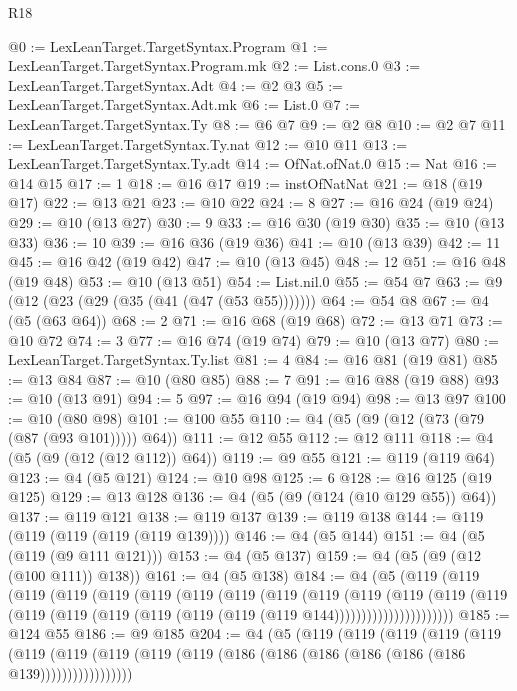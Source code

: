 \begin{lexlean}{R18}
\begin{coremodule}
@0 := LexLeanTarget.TargetSyntax.Program
@1 := LexLeanTarget.TargetSyntax.Program.mk
@2 := List.cons.{0}
@3 := LexLeanTarget.TargetSyntax.Adt
@4 := @2 @3
@5 := LexLeanTarget.TargetSyntax.Adt.mk
@6 := List.{0}
@7 := LexLeanTarget.TargetSyntax.Ty
@8 := @6 @7
@9 := @2 @8
@10 := @2 @7
@11 := LexLeanTarget.TargetSyntax.Ty.nat
@12 := @10 @11
@13 := LexLeanTarget.TargetSyntax.Ty.adt
@14 := OfNat.ofNat.{0}
@15 := Nat
@16 := @14 @15
@17 := 1
@18 := @16 @17
@19 := instOfNatNat
@21 := @18 (@19 @17)
@22 := @13 @21
@23 := @10 @22
@24 := 8
@27 := @16 @24 (@19 @24)
@29 := @10 (@13 @27)
@30 := 9
@33 := @16 @30 (@19 @30)
@35 := @10 (@13 @33)
@36 := 10
@39 := @16 @36 (@19 @36)
@41 := @10 (@13 @39)
@42 := 11
@45 := @16 @42 (@19 @42)
@47 := @10 (@13 @45)
@48 := 12
@51 := @16 @48 (@19 @48)
@53 := @10 (@13 @51)
@54 := List.nil.{0}
@55 := @54 @7
@63 := @9 (@12 (@23 (@29 (@35 (@41 (@47 (@53 @55)))))))
@64 := @54 @8
@67 := @4 (@5 (@63 @64))
@68 := 2
@71 := @16 @68 (@19 @68)
@72 := @13 @71
@73 := @10 @72
@74 := 3
@77 := @16 @74 (@19 @74)
@79 := @10 (@13 @77)
@80 := LexLeanTarget.TargetSyntax.Ty.list
@81 := 4
@84 := @16 @81 (@19 @81)
@85 := @13 @84
@87 := @10 (@80 @85)
@88 := 7
@91 := @16 @88 (@19 @88)
@93 := @10 (@13 @91)
@94 := 5
@97 := @16 @94 (@19 @94)
@98 := @13 @97
@100 := @10 (@80 @98)
@101 := @100 @55
@110 := @4 (@5 (@9 (@12 (@73 (@79 (@87 (@93 @101))))) @64))
@111 := @12 @55
@112 := @12 @111
@118 := @4 (@5 (@9 (@12 (@12 @112)) @64))
@119 := @9 @55
@121 := @119 (@119 @64)
@123 := @4 (@5 @121)
@124 := @10 @98
@125 := 6
@128 := @16 @125 (@19 @125)
@129 := @13 @128
@136 := @4 (@5 (@9 (@124 (@10 @129 @55)) @64))
@137 := @119 @121
@138 := @119 @137
@139 := @119 @138
@144 := @119 (@119 (@119 (@119 (@119 @139))))
@146 := @4 (@5 @144)
@151 := @4 (@5 (@119 (@9 @111 @121)))
@153 := @4 (@5 @137)
@159 := @4 (@5 (@9 (@12 (@100 @111)) @138))
@161 := @4 (@5 @138)
@184 := @4
    (@5
      (@119
        (@119
          (@119
            (@119
              (@119
                (@119
                  (@119
                    (@119
                      (@119
                        (@119
                          (@119
                            (@119
                              (@119
                                (@119
                                  (@119
                                    (@119 (@119 (@119 (@119 (@119 (@119 @144))))))))))))))))))))))
@185 := @124 @55
@186 := @9 @185
@204 := @4
    (@5
      (@119
        (@119
          (@119
            (@119
              (@119
                (@119
                  (@119 (@119 (@119 (@119 (@186 (@186 (@186 (@186 (@186 (@186 @139)))))))))))))))))

\end{coremodule}
\end{lexlean}
